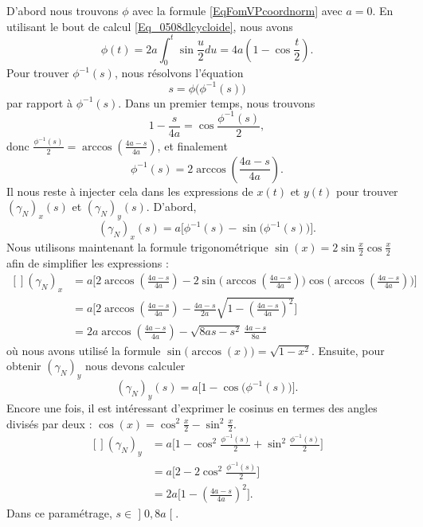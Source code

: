 \begin{example}
D'abord nous trouvons $\phi$ avec la formule \eqref{EqFomVPcoordnorm} avec $a=0$. En utilisant le bout de calcul \eqref{Eq_0508dlcycloide}, nous avons
\begin{equation}
    \phi(t)=2a\int_0^t\sin\frac{ u }{2}du=4a\left( 1-\cos\frac{t}{2} \right).
\end{equation}
Pour trouver $\phi^{-1}(s)$, nous résolvons l'équation
\begin{equation}
    s=\phi\big( \phi^{-1}(s) \big)
\end{equation}
par rapport à $\phi^{-1}(s)$. Dans un premier temps, nous trouvons
\begin{equation}
    1-\frac{ s }{ 4a }=\cos\frac{ \phi^{-1}(s) }{ 2 },
\end{equation}
donc $\frac{ \phi^{-1}(s) }{2}=\arccos(\frac{ 4a-s }{ 4a })$, et finalement
\begin{equation}
    \phi^{-1}(s)=2\arccos\left(\frac{ 4a-s }{ 4a }\right).
\end{equation}
Il nous reste à injecter cela dans les expressions de $x(t)$ et $y(t)$ pour trouver $(\gamma_N)_x(s)$ et $(\gamma_N)_y(s)$. D'abord,
\begin{equation}
    (\gamma_N)_x(s)=a\big[ \phi^{-1}(s)-\sin\big( \phi^{-1}(s) \big) \big].
\end{equation}
Nous utilisons maintenant la formule trigonométrique $\sin(x)=2\sin\frac{ x }{ 2 }\cos\frac{ x }{2}$ afin de simplifier les expressions :
\begin{equation}
    \begin{aligned}[]
        (\gamma_N)_x&=a\Big[ 2\arccos\left( \frac{ 4a-s }{ 4a } \right)-2\sin\big( \arccos\left( \frac{ 4a-s }{ 4a } \right) \big)\cos\big( \arccos\left( \frac{ 4a-s }{ 4a } \right) \big) \Big]\\
        &=a\Big[ 2\arccos\left( \frac{ 4a-s }{ 4a } \right)-\frac{ 4a-s }{ 2a } \sqrt{1-\left( \frac{ 4a-s }{ 4a } \right)^2}\Big]\\
        &=2a\arccos\left( \frac{ 4a-s }{ 4a } \right)-\sqrt{8as-s^2}\,\frac{ 4a-s }{ 8a }
    \end{aligned}
\end{equation}
où nous avons utilisé la formule $\sin\big( \arccos(x) \big)=\sqrt{1-x^2}$. Ensuite, pour obtenir $(\gamma_N)_y$ nous devons calculer
\begin{equation}
    (\gamma_N)_y(s)=a\big[ 1-\cos\big( \phi^{-1}(s) \big) \big].
\end{equation}
Encore une fois, il est intéressant d'exprimer le cosinus en termes des angles divisés par deux : $\cos(x)=\cos^2\frac{ x }{2}-\sin^2\frac{ x }{2}$.
\begin{equation}
    \begin{aligned}[]
        (\gamma_N)_y&=a\Big[ 1-\cos^2\frac{ \phi^{-1}(s) }{2}+\sin^2\frac{ \phi^{-1}(s) }{2} \Big]\\
        &=a\Big[ 2-2\cos^2\frac{ \phi^{-1}(s) }{2} \Big]\\
        &=2a\Big[ 1-\left( \frac{ 4a-s }{ 4a } \right)^2 \Big].
    \end{aligned}
\end{equation}
Dans ce paramétrage, $s\in\mathopen] 0 , 8a \mathclose[$.
\end{example}

